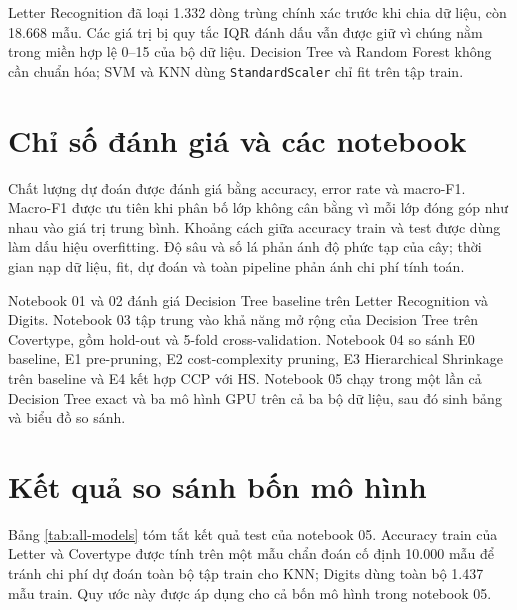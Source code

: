 Letter Recognition đã loại 1.332 dòng trùng chính xác trước khi chia dữ liệu, còn 18.668
mẫu. Các giá trị bị quy tắc IQR đánh dấu vẫn được giữ vì chúng nằm trong miền hợp lệ 0--15
của bộ dữ liệu. Decision Tree và Random Forest không cần chuẩn hóa; SVM và KNN dùng
\texttt{StandardScaler} chỉ fit trên tập train.

\section{Chỉ số đánh giá và các notebook}

Chất lượng dự đoán được đánh giá bằng accuracy, error rate và macro-F1. Macro-F1 được
ưu tiên khi phân bố lớp không cân bằng vì mỗi lớp đóng góp như nhau vào giá trị trung bình.
Khoảng cách giữa accuracy train và test được dùng làm dấu hiệu overfitting. Độ sâu và số
lá phản ánh độ phức tạp của cây; thời gian nạp dữ liệu, fit, dự đoán và toàn pipeline phản
ánh chi phí tính toán.

Notebook 01 và 02 đánh giá Decision Tree baseline trên Letter Recognition và Digits.
Notebook 03 tập trung vào khả năng mở rộng của Decision Tree trên Covertype, gồm hold-out
và 5-fold cross-validation. Notebook 04 so sánh E0 baseline, E1 pre-pruning, E2
cost-complexity pruning, E3 Hierarchical Shrinkage trên baseline và E4 kết hợp CCP với HS.
Notebook 05 chạy trong một lần cả Decision Tree exact và ba mô hình GPU trên cả ba bộ dữ
liệu, sau đó sinh bảng và biểu đồ so sánh.

\section{Kết quả so sánh bốn mô hình}

Bảng \ref{tab:all-models} tóm tắt kết quả test của notebook 05. Accuracy train của Letter
và Covertype được tính trên một mẫu chẩn đoán cố định 10.000 mẫu để tránh chi phí dự đoán
toàn bộ tập train cho KNN; Digits dùng toàn bộ 1.437 mẫu train. Quy ước này được áp dụng
cho cả bốn mô hình trong notebook 05.

